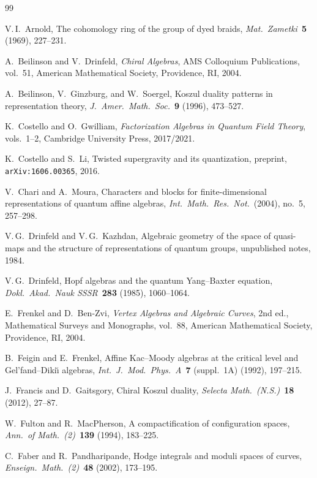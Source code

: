\documentclass[11pt,reqno]{amsart}
\theoremstyle{definition}
\theoremstyle{remark}
\numberwithin{equation}{section}
\begin{document}
\begin{thebibliography}{99}

V.\,I.~Arnold,
The cohomology ring of the group of dyed braids,
\textit{Mat.\ Zametki}~\textbf{5} (1969), 227--231.

A.~Beilinson and V.~Drinfeld,
\textit{Chiral Algebras},
AMS Colloquium Publications, vol.~51,
American Mathematical Society, Providence, RI, 2004.

A.~Beilinson, V.~Ginzburg, and W.~Soergel,
Koszul duality patterns in representation theory,
\textit{J.~Amer.\ Math.\ Soc.}~\textbf{9} (1996),
473--527.

K.~Costello and O.~Gwilliam,
\textit{Factorization Algebras in Quantum Field Theory},
vols.~1--2, Cambridge University Press, 2017/2021.

K.~Costello and S.~Li,
Twisted supergravity and its quantization,
preprint, \texttt{arXiv:1606.00365}, 2016.

V.~Chari and A.~Moura,
Characters and blocks for finite-dimensional
representations of quantum affine algebras,
\textit{Int.\ Math.\ Res.\ Not.}\ (2004), no.~5,
257--298.

V.\,G.~Drinfeld and V.\,G.~Kazhdan,
Algebraic geometry of the space of quasi-maps
and the structure of representations of quantum groups,
unpublished notes, 1984.

V.\,G.~Drinfeld,
Hopf algebras and the quantum Yang--Baxter equation,
\textit{Dokl.\ Akad.\ Nauk SSSR}~\textbf{283} (1985),
1060--1064.

E.~Frenkel and D.~Ben-Zvi,
\textit{Vertex Algebras and Algebraic Curves},
2nd ed., Mathematical Surveys and Monographs, vol.~88,
American Mathematical Society, Providence, RI, 2004.

B.~Feigin and E.~Frenkel,
Affine Kac--Moody algebras at the critical level and
Gel'fand--Diki\u{\i} algebras,
\textit{Int.\ J.\ Mod.\ Phys.\ A}~\textbf{7}
(suppl.\ 1A) (1992), 197--215.

J.~Francis and D.~Gaitsgory,
Chiral Koszul duality,
\textit{Selecta Math.\ (N.S.)}~\textbf{18} (2012),
27--87.

\bibitem{}
W.~Fulton and R.~MacPherson,
A compactification of configuration spaces,
\textit{Ann.\ of Math.\ (2)}~\textbf{139} (1994),
183--225.

C.~Faber and R.~Pandharipande,
Hodge integrals and moduli spaces of curves,
\textit{Enseign.\ Math.\ (2)}~\textbf{48} (2002),
173--195.


\end{thebibliography}
\end{document}
